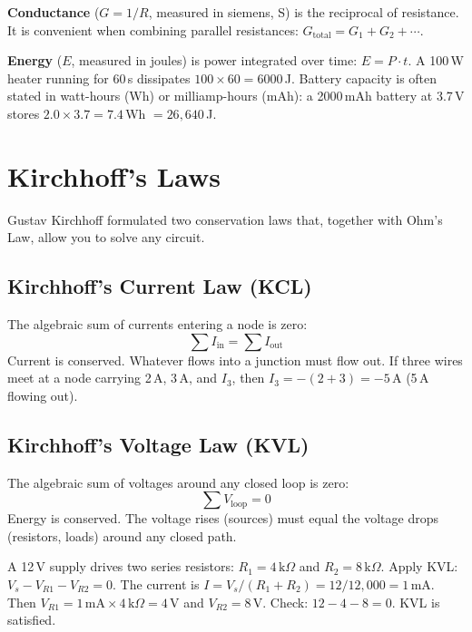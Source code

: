 \documentclass[11pt,letterpaper,twoside,openany]{book}
\begin{document}
\textbf{Conductance} ($G = 1/R$, measured in siemens, S) is the reciprocal of resistance. It is convenient when combining parallel resistances: $G_{\text{total}} = G_1 + G_2 + \cdots$.

\textbf{Energy} ($E$, measured in joules) is power integrated over time: $E = P \cdot t$. A 100\,W heater running for 60\,s dissipates $100 \times 60 = 6000$\,J. Battery capacity is often stated in watt-hours (Wh) or milliamp-hours (mAh): a 2000\,mAh battery at 3.7\,V stores $2.0 \times 3.7 = 7.4$\,Wh $= 26{,}640$\,J.

\section{Kirchhoff's Laws}

Gustav Kirchhoff formulated two conservation laws that, together with Ohm's Law, allow you to solve any circuit.

\subsection{Kirchhoff's Current Law (KCL)}
The algebraic sum of currents entering a node is zero:
\begin{equation}
\sum I_{\text{in}} = \sum I_{\text{out}}
\end{equation}
Current is conserved. Whatever flows into a junction must flow out. If three wires meet at a node carrying 2\,A, 3\,A, and $I_3$, then $I_3 = -(2+3) = -5$\,A (5\,A flowing out).

\subsection{Kirchhoff's Voltage Law (KVL)}
The algebraic sum of voltages around any closed loop is zero:
\begin{equation}
\sum V_{\text{loop}} = 0
\end{equation}
Energy is conserved. The voltage rises (sources) must equal the voltage drops (resistors, loads) around any closed path.

\begin{examplebox}
A 12\,V supply drives two series resistors: $R_1 = 4\,\text{k}\Omega$ and $R_2 = 8\,\text{k}\Omega$. Apply KVL: $V_s - V_{R1} - V_{R2} = 0$. The current is $I = V_s/(R_1 + R_2) = 12/12{,}000 = 1\,\text{mA}$. Then $V_{R1} = 1\,\text{mA} \times 4\,\text{k}\Omega = 4\,\text{V}$ and $V_{R2} = 8\,\text{V}$. Check: $12 - 4 - 8 = 0$. KVL is satisfied.
\end{examplebox}
\end{document}
